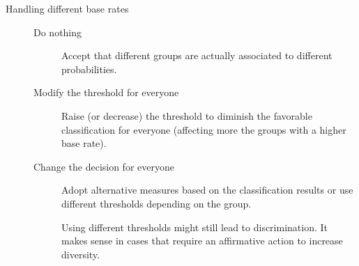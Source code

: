 \begin{description}
    \item[Handling different base rates] \phantom{}
        \begin{description}
            \item[Do nothing] 
                Accept that different groups are actually associated to different probabilities.

            \item[Modify the threshold for everyone] 
                Raise (or decrease) the threshold to diminish the favorable classification for everyone (affecting more the groups with a higher base rate).

            \item[Change the decision for everyone] 
                Adopt alternative measures based on the classification results or use different thresholds depending on the group.

                \begin{remark}
                    Using different thresholds might still lead to discrimination. It makes sense in cases that require an affirmative action to increase diversity.
                \end{remark}
        \end{description}
\end{description}

